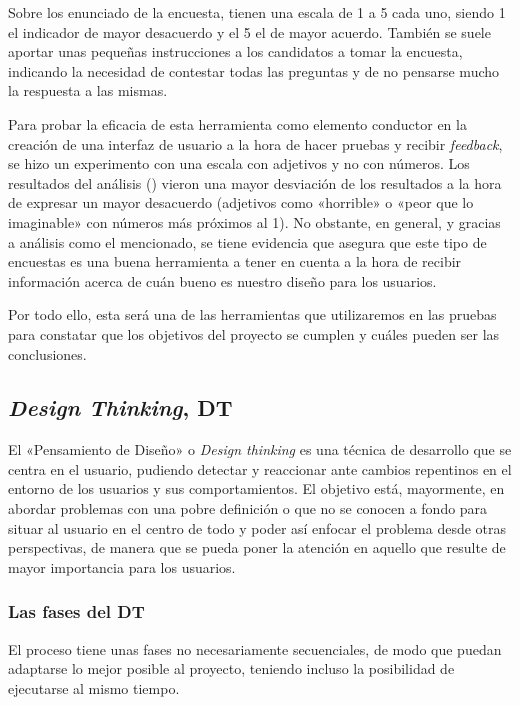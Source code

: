 Sobre los enunciado de la encuesta, tienen una escala de 1 a 5 cada uno, siendo 1 el indicador de mayor desacuerdo y el 5 el de mayor acuerdo. También se suele aportar unas pequeñas instrucciones a los candidatos a tomar la encuesta, indicando la necesidad de contestar todas las preguntas y de no pensarse mucho la respuesta a las mismas.

Para probar la eficacia de esta herramienta como elemento conductor en la creación de una interfaz de usuario a la hora de hacer pruebas y recibir \textit{feedback}, se hizo un experimento con una escala con adjetivos y no con números. Los resultados del análisis (\citep{sus}) vieron una mayor desviación de los resultados a la hora de expresar un mayor desacuerdo (adjetivos como «horrible» o «peor que lo imaginable» con números más próximos al 1). No obstante, en general, y gracias a análisis como el mencionado, se tiene evidencia que asegura que este tipo de encuestas es una buena herramienta a tener en cuenta a la hora de recibir información acerca de cuán bueno es nuestro diseño para los usuarios.

Por todo ello, esta será una de las herramientas que utilizaremos en las pruebas para constatar que los objetivos del proyecto se cumplen y cuáles pueden ser las conclusiones.

\subsection{\textit{Design Thinking}, DT}

El «Pensamiento de Diseño» o \textit{Design thinking} es una técnica de desarrollo que se centra en el usuario, pudiendo detectar y reaccionar ante cambios repentinos en el entorno de los usuarios y sus comportamientos. El objetivo está, mayormente, en abordar problemas con una pobre definición o que no se conocen a fondo para situar al usuario en el centro de todo y poder así enfocar el problema desde otras perspectivas, de manera que se pueda poner la atención en aquello que resulte de mayor importancia para los usuarios.

\subsubsection{Las fases del DT}

El proceso tiene unas fases no necesariamente secuenciales, de modo que puedan adaptarse lo mejor posible al proyecto, teniendo incluso la posibilidad de ejecutarse al mismo tiempo.

